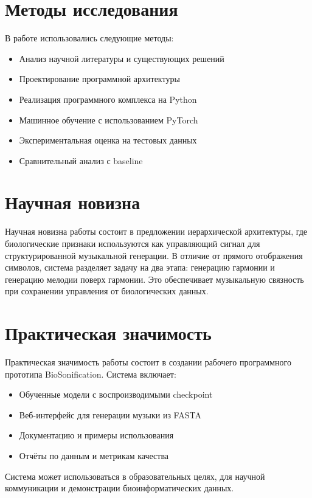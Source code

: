 \section*{Методы исследования}

В работе использовались следующие методы:
\begin{itemize}
\item Анализ научной литературы и существующих решений
\item Проектирование программной архитектуры
\item Реализация программного комплекса на Python
\item Машинное обучение с использованием PyTorch
\item Экспериментальная оценка на тестовых данных
\item Сравнительный анализ с baseline
\end{itemize}

\section*{Научная новизна}

Научная новизна работы состоит в предложении иерархической архитектуры, где биологические признаки используются как управляющий сигнал для структурированной музыкальной генерации. В отличие от прямого отображения символов, система разделяет задачу на два этапа: генерацию гармонии и генерацию мелодии поверх гармонии. Это обеспечивает музыкальную связность при сохранении управления от биологических данных.

\section*{Практическая значимость}

Практическая значимость работы состоит в создании рабочего программного прототипа BioSonification. Система включает:
\begin{itemize}
\item Обученные модели с воспроизводимыми checkpoint
\item Веб-интерфейс для генерации музыки из FASTA
\item Документацию и примеры использования
\item Отчёты по данным и метрикам качества
\end{itemize}

Система может использоваться в образовательных целях, для научной коммуникации и демонстрации биоинформатических данных.

